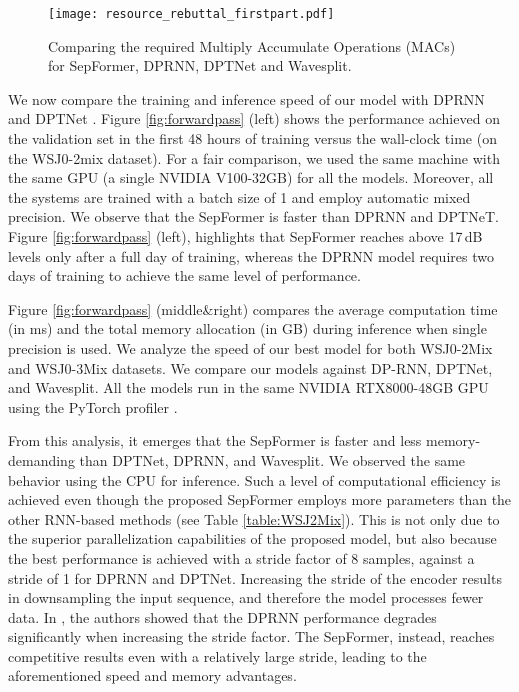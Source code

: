 \documentclass[lettersize,journal]{IEEEtran}
\begin{document}
\begin{figure}
    \centering
    \texttt{[image: resource\_rebuttal\_firstpart.pdf]}
    \caption{Comparing the required Multiply Accumulate Operations (MACs) for SepFormer, DPRNN, DPTNet and Wavesplit. }
    \label{fig:macsfirstfigure}
\end{figure}

We now compare the training and inference speed of our model with DPRNN \cite{luo2020dualpath} and DPTNet \cite{dptn}. Figure \ref{fig:forwardpass} (left) shows the performance achieved on the validation set in the first 48 hours of training versus the wall-clock time (on the WSJ0-2mix dataset).
For a fair comparison, we used the same machine with the same GPU (a single NVIDIA V100-32GB) for all the models. Moreover, all the systems are trained with a batch size of 1 and employ automatic mixed precision.  We observe that the SepFormer is faster than DPRNN and DPTNeT.  Figure \ref{fig:forwardpass} (left), highlights that SepFormer 
reaches above 17\,dB levels only after a full day of training, whereas the DPRNN model requires two days of training to achieve the same level of performance.  

Figure \ref{fig:forwardpass} (middle\&right) compares the average computation time (in ms) and the total memory allocation (in GB) during inference when single precision is used. We analyze the speed of our best model for both WSJ0-2Mix and WSJ0-3Mix datasets. We compare our models against DP-RNN, DPTNet, and Wavesplit. All the models run in the same NVIDIA RTX8000-48GB GPU using the PyTorch profiler \cite{pytorch-profiler}. 

From this analysis, it emerges that the SepFormer is faster and less memory-demanding than DPTNet, DPRNN, and Wavesplit. We observed the same behavior using the CPU for inference. Such a level of computational efficiency is achieved even though the proposed SepFormer employs more parameters than the other RNN-based methods (see Table \ref{table:WSJ2Mix}).
This is not only due to the superior parallelization capabilities of the proposed model, but also because the best performance is achieved with a stride factor of 8 samples, against a stride of 1 for DPRNN and DPTNet. Increasing the stride of the encoder results in downsampling the input sequence, and therefore the model processes fewer data. In \cite{luo2020dualpath}, the authors showed that the DPRNN performance degrades significantly when increasing the stride factor. The  SepFormer, instead, reaches competitive results even with a relatively large stride, leading to the aforementioned speed and memory advantages. 
\end{document}
